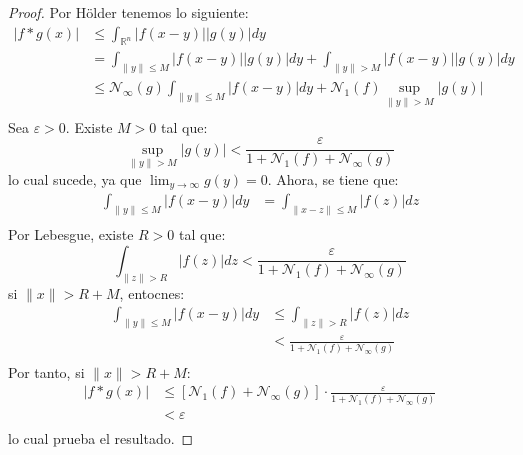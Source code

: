 \documentclass[12pt]{report}
\theoremstyle{largebreak}
\newcommand\abs[1]{\ensuremath{\big|#1\big|}}
\newcommand\norm[1]{\ensuremath{\|#1\|}}
\newcommand{\N}[2]{\ensuremath{\mathcal{N}_{#1}\left(#2\right)}}
\begin{document}
    \begin{proof}
        Por Hölder tenemos lo siguiente:
        \begin{equation*}
            \begin{split}
                \abs{f*g(x)}&\leq\int_{\mathbb{R}^n}\abs{f(x-y)}\abs{g(y)}dy\\
                &=\int_{\norm{y}\leq M }\abs{f(x-y)}\abs{g(y)}dy+\int_{\norm{y}>M}\abs{f(x-y)}\abs{g(y)}dy\\
                &\leq\N{\infty}{g}\int_{\norm{y}\leq M }\abs{f(x-y)}dy+\N{1}{f}\sup_{ \norm{y}>M}\abs{g(y)}\\
            \end{split}
        \end{equation*}
        Sea $\varepsilon>0$. Existe $M>0$ tal que:
        \begin{equation*}
            \sup_{ \norm{y}>M}\abs{g(y)}<\frac{\varepsilon}{1+\N{1}{f}+\N{\infty}{g}}
        \end{equation*}
        lo cual sucede, ya que $\lim_{y\rightarrow\infty} g(y)=0$. Ahora, se tiene que:
        \begin{equation*}
            \begin{split}
                \int_{\norm{y}\leq M } \abs{f(x-y)} dy &=\int_{\norm{x-z}\leq M }\abs{f(z)}dz\\
            \end{split}
        \end{equation*}
        Por Lebesgue, existe $R>0$ tal que:
        \begin{equation*}
            \int_{\norm{z}>R }\abs{f(z)}dz<\frac{\varepsilon}{1+\N{1}{f}+\N{\infty}{g}}
        \end{equation*}
        si $\norm{x}>R+M$, entocnes:
        \begin{equation*}
            \begin{split}
                \int_{\norm{y}\leq M } \abs{f(x-y)} dy &\leq\int_{\norm{z}>R }\abs{f(z)}dz\\
                &<\frac{\varepsilon}{1+\N{1}{f}+\N{\infty}{g}}\\
            \end{split}
        \end{equation*}
        Por tanto, si $\norm{x}>R+M$:
        \begin{equation*}
            \begin{split}
                \abs{f*g(x)}&\leq\left[\N{1}{f}+\N{\infty}{g} \right]\cdot \frac{\varepsilon}{1+\N{1}{f}+\N{\infty}{g}}\\
                &<\varepsilon\\
            \end{split}
        \end{equation*}
        lo cual prueba el resultado.
    \end{proof}
\end{document}
